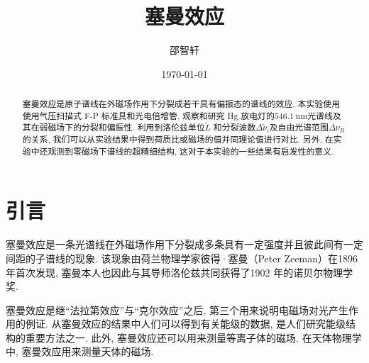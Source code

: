 \documentclass[aps,pre,12pt,preprint,onecolumn,showpacs,showkeys]{revtex4-1}
\begin{document}
\title{\bf\heiti{}塞曼效应\vspace{15mm}}
\author{\fangsong{}邵智轩\vspace{2mm}}
\date{\today}

\begin{abstract}
\vspace{10mm}
\begin{spacing}{1.5}
\songti{}
塞曼效应是原子谱线在外磁场作用下分裂成若干具有偏振态的谱线的效应. 本实验使用使用气压扫描式 F-P 标准具和光电倍增管, 观察和研究 Hg 放电灯的$546.1\ \textrm{nm}$光谱线及其在弱磁场下的分裂和偏振性. 利用到洛伦兹单位$\tilde L$ 和分裂波数$\Delta \tilde \nu_i$及自由光谱范围$\Delta \nu_R$的关系, 我们可以从实验结果中得到荷质比或磁场的值并同理论值进行对比. 另外, 在实验中还观测到零磁场下谱线的超精细结构, 这对于本实验的一些结果有启发性的意义. 
\end{spacing}
\end{abstract}
\maketitle
\songti{}

\section{引言}
塞曼效应是一条光谱线在外磁场作用下分裂成多条具有一定强度并且彼此间有一定间距的子谱线的现象. 该现象由荷兰物理学家彼得·塞曼（Peter Zeeman）在1896 年首次发现, 塞曼本人也因此与其导师洛伦兹共同获得了1902 年的诺贝尔物理学奖.
	
塞曼效应是继“法拉第效应”与“克尔效应”之后, 第三个用来说明电磁场对光产生作用的例证. 从塞曼效应的结果中人们可以得到有关能级的数据, 是人们研究能级结构的重要方法之一. 此外, 塞曼效应还可以用来测量等离子体的磁场. 在天体物理学中, 塞曼效应用来测量天体的磁场. 
\end{document}
